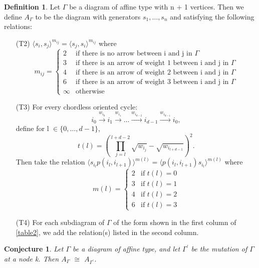 \documentclass[11pt]{amsart}
\newtheorem{conj}[thm]{Conjecture}
\theoremstyle{definition}
\newtheorem{defn}[thm]{Definition}
\begin{document}
\begin{defn}
Let $\Gamma$ be a diagram of affine type with n + 1 vertices. Then we define $A_{\Gamma}$ to be the diagram with generators $s_{1}, \dots, s_{n}$ and satisfying the following relations:
\begin{enumerate}
\item[(T2)] $\langle s_{i}, s_{j} \rangle^{m_{ij}} = \langle s_{j}, s_{i} \rangle^{m_{ij}}$ where
$$m_{ij} = 
\begin{cases}
2 &\text{if there is no arrow between i and j in $\Gamma$} \\
3 &\text{if there is an arrow of weight 1 between i and j in $\Gamma$} \\
4 &\text{if there is an arrow of weight 2 between i and j in $\Gamma$} \\
6 &\text{if there is an arrow of weight 3 between i and j in $\Gamma$} \\
\infty &\text{otherwise}
\end{cases}$$
\item[(T3)] For every chordless oriented cycle:
$$i_{0} \stackrel{w_{i_{0}}}{\longrightarrow} i_{1} \stackrel{w_{i_{1}}}{\longrightarrow} \dots \stackrel{w_{i_{d-2}}}{\longrightarrow} i_{d-1} \stackrel{w_{i_{d-1}}}{\longrightarrow} i_{0},$$
define for l $\in \{0, \dots, d-1\}$, 
$$t(l) = (\prod_{j=l}^{l+d-2}{\sqrt{w_{i_{j}}}} - \sqrt{w_{i_{l+d-1}}})^{2}.$$
Then take the relation $\langle s_{i_{l}}p(i_{l}, i_{l+1}) \rangle^{m(l)} = \langle p(i_{l}, i_{l+1})s_{i_{l}} \rangle^{m(l)}$ where
$$m(l) =
\begin{cases}
2 &\text{if $t(l)=0$} \\
3 &\text{if $t(l)=1$} \\
4 &\text{if $t(l)=2$} \\
6 &\text{if $t(l)=3$}
\end{cases}$$
\item[(T4)] For each subdiagram of $\Gamma$ of the form shown in the first column of \ref{table2}, we add the relation(s) listed in the second column.
\end{enumerate}
\end{defn}

\begin{conj}
Let $\Gamma$ be a diagram of affine type, and let $\Gamma^{\prime}$ be the mutation of $\Gamma$ at a node k. Then $A_{\Gamma}$ $\cong$ $A_{\Gamma^{\prime}}$.
\end{conj}
\end{document}
